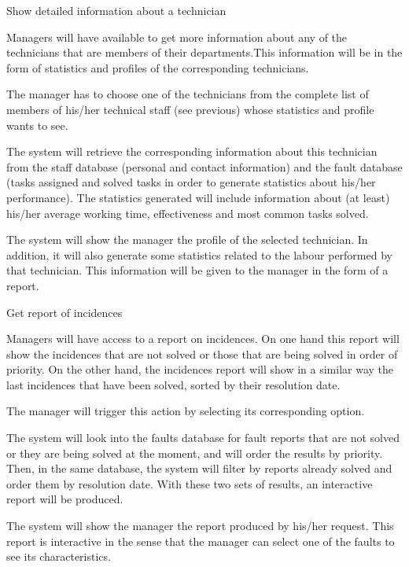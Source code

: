\begin{requirement}{Show detailed information about a technician}

\reqdesc Managers will have available to get more information about any of the technicians that are members of their departments.This information will be in the form of statistics and profiles of the corresponding technicians.

\reqin The manager has to choose one of the technicians from the complete list of members of his/her technical staff (see previous) whose statistics and profile wants to see. 

\reqsteps The system will retrieve the corresponding information about this technician from the staff database (personal and contact information) and the fault database (tasks assigned and solved tasks in order to generate statistics about his/her performance). The statistics generated will include information about (at least) his/her average working time, effectiveness and most common tasks solved.

\reqout The system will show the manager the profile of the selected technician. In addition, it will also generate some statistics related to the labour performed by that technician. This information will be given to the manager in the form of a report.

\end{requirement}


\begin{requirement}{Get report of incidences}

\reqdesc Managers will have access to a report on incidences. On one hand this report will show the incidences that are not solved or those that are being solved in order of priority. On the other hand, the incidences report will show in a similar way the last incidences that have been solved, sorted by
their resolution date.

\reqin The manager will trigger this action by selecting its corresponding option.

\reqsteps The system will look into the faults database for fault reports that are not solved or they are being solved at the moment, and will order the results by priority. Then, in the same database, the system will filter by reports already solved and order them by resolution date. With these two sets of results, an interactive report will be produced.

\reqout The system will show the manager the report produced by his/her request. This report is interactive in the sense that the manager can select one of the faults to see its characteristics.

\end{requirement}


